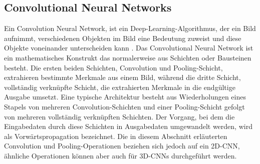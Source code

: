 \documentclass[paper=A4,pagesize=auto,12pt,headinclude=true,footinclude=true,BCOR=0mm,DIV=calc]{scrartcl}
\begin{document}
\subsection{Convolutional Neural Networks}\label{subsec:CNN} %
Ein Convolution Neural Network, ist ein Deep-Learning-Algorithmus, der ein Bild aufnimmt, verschiedenen Objekten im Bild eine Bedeutung zuweist und diese Objekte voneinander unterscheiden kann \cite{cnn1}. Das Convolutional Neural Network ist ein mathematisches Konstrukt das normalerweise aus Schichten oder Bausteinen besteht. Die ersten beiden Schichten, Convolution und Pooling-Schicht, extrahieren bestimmte Merkmale aus einem Bild, während die dritte Schicht, vollständig verknüpfte Schicht, die extrahierten Merkmale in die endgültige Ausgabe umsetzt. Eine typische Architektur besteht aus Wiederholungen eines Stapels von mehreren Convolution-Schichten und einer Pooling-Schicht gefolgt von mehreren vollständig verknüpften Schichten. Der Vorgang, bei dem die Eingabedaten durch diese Schichten in Ausgabedaten umgewandelt werden, wird als Vorwärtspropagation bezeichnet. Die in diesem Abschnitt erläuterten Convolution und Pooling-Operationen beziehen sich jedoch auf ein 2D-CNN, ähnliche Operationen können aber auch für 3D-CNNs durchgeführt werden. \cite{cnn2}
\end{document}
